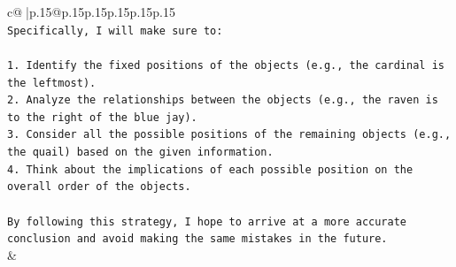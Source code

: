 \documentclass{article}
\begin{document}
{\begin{supertabular}{c@{$\;$}|p{.15\linewidth}@{}p{.15\linewidth}p{.15\linewidth}p{.15\linewidth}p{.15\linewidth}p{.15\linewidth}}
{{{\\ 
\texttt{Specifically, I will make sure to:} \\
\\ 
\texttt{1. Identify the fixed positions of the objects (e.g., the cardinal is the leftmost).} \\
\texttt{2. Analyze the relationships between the objects (e.g., the raven is to the right of the blue jay).} \\
\texttt{3. Consider all the possible positions of the remaining objects (e.g., the quail) based on the given information.} \\
\texttt{4. Think about the implications of each possible position on the overall order of the objects.} \\
\\ 
\texttt{By following this strategy, I hope to arrive at a more accurate conclusion and avoid making the same mistakes in the future.} \\
            }
        }
    }
    & \\ \\

\end{supertabular}
}
\end{document}
